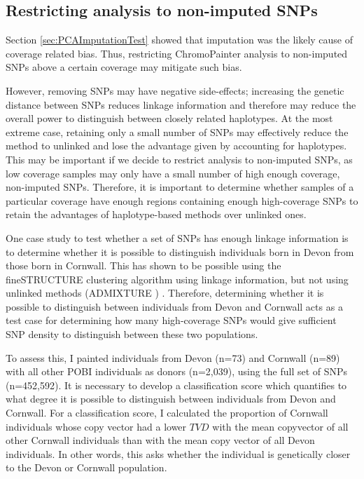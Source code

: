 \subsection{Restricting analysis to non-imputed SNPs}

Section \ref{sec:PCAImputationTest} showed that imputation was the likely cause of coverage related bias. Thus, restricting ChromoPainter analysis to non-imputed SNPs above a certain coverage may mitigate such bias.

However, removing SNPs may have negative side-effects; increasing the genetic distance between SNPs reduces linkage information and therefore may reduce the overall power to distinguish between closely related haplotypes. At the most extreme case, retaining only a small number of SNPs may effectively reduce the method to unlinked and lose the advantage given by accounting for haplotypes. This may be important if we decide to restrict analysis to non-imputed SNPs, as low coverage samples may only have a small number of high enough coverage, non-imputed SNPs. Therefore, it is important to determine whether samples of a particular coverage have enough regions containing enough high-coverage SNPs to retain the advantages of haplotype-based methods over unlinked ones. 

One case study to test whether a set of SNPs has enough linkage information is to determine whether it is possible to distinguish individuals born in Devon from those born in Cornwall. This has shown to be possible using the fineSTRUCTURE clustering algorithm using linkage information, but not using unlinked methods (ADMIXTURE \cite{alexander2009fast}) \cite{Leslie2015}. Therefore, determining whether it is possible to distinguish between individuals from Devon and Cornwall acts as a test case for determining how many high-coverage SNPs would give sufficient SNP density to distinguish between these two populations.

To assess this, I painted individuals from Devon (n=73) and Cornwall (n=89) with all other POBI individuals as donors (n=2,039), using the full set of SNPs (n=452,592). It is necessary to develop a classification score which quantifies to what degree it is possible to distinguish between individuals from Devon and Cornwall. For a classification score, I calculated the proportion of Cornwall individuals whose copy vector had a lower $TVD$ with the mean copyvector of all other Cornwall individuals than with the mean copy vector of all Devon individuals. In other words, this asks whether the individual is genetically closer to the Devon or Cornwall population.

